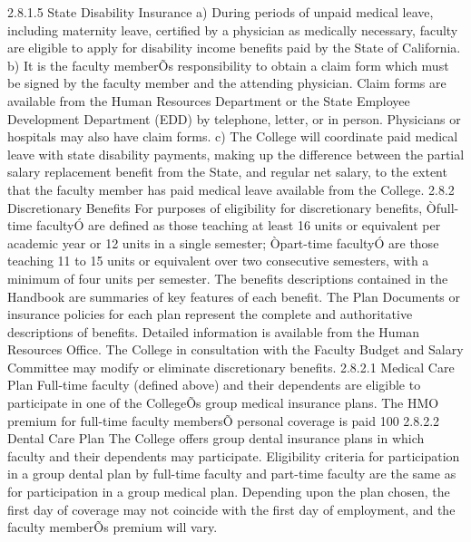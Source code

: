 \documentclass[letterpaper, 11pt]{article}
\begin{document}
	2.8.1.5 State Disability Insurance
	a) During periods of unpaid medical leave, including maternity leave, certified by a physician as medically necessary, faculty are eligible to apply for disability income benefits paid by the State of California.
	b) It is the faculty memberÕs responsibility to obtain a claim form which must be signed by the faculty member and the attending physician.  Claim forms are available from the Human Resources Department or the State Employee Development Department (EDD) by telephone, letter, or in person.  Physicians or hospitals may also have claim forms.
	c) The College will coordinate paid medical leave with state disability payments, making up the difference between the partial salary replacement benefit from the State, and regular net salary, to the extent that the faculty member has paid medical leave available from the College.
	2.8.2 Discretionary Benefits
	For purposes of eligibility for discretionary benefits, Òfull-time facultyÓ are defined as those teaching at least 16 units or equivalent per academic year or 12 units in a single semester; Òpart-time facultyÓ are those teaching 11 to 15 units or equivalent over two consecutive semesters, with a minimum of four units per semester.  The benefits descriptions contained in the Handbook are summaries of key features of each benefit.  The Plan Documents or insurance policies for each plan represent the complete and authoritative descriptions of benefits.  Detailed information is available from the Human Resources Office.  The College in consultation with the Faculty Budget and Salary Committee may modify or eliminate discretionary benefits.
	2.8.2.1 Medical Care Plan
	Full-time faculty (defined above) and their dependents are eligible to participate in one of the CollegeÕs group medical insurance plans.  The HMO premium for full-time faculty membersÕ personal coverage is paid 100%
	2.8.2.2 Dental Care Plan
	The College offers group dental insurance plans in which faculty and their dependents may participate.  Eligibility criteria for participation in a group dental plan by full-time faculty and part-time faculty are the same as for participation in a group medical plan.  Depending upon the plan chosen, the first day of coverage may not coincide with the first day of employment, and the faculty memberÕs premium will vary.
\end{document}
